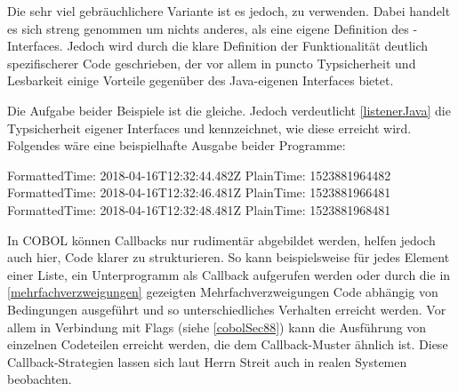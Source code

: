 
Die sehr viel gebräuchlichere Variante ist es jedoch,  zu verwenden. Dabei handelt es sich streng genommen um nichts anderes, als eine eigene Definition des -Interfaces. Jedoch wird durch die klare Definition der Funktionalität deutlich spezifischerer Code geschrieben, der vor allem in puncto Typsicherheit und Lesbarkeit einige Vorteile gegenüber des Java-eigenen Interfaces bietet.


Die Aufgabe beider Beispiele ist die gleiche. Jedoch verdeutlicht \autoref{listenerJava} die Typsicherheit eigener Interfaces und kennzeichnet, wie diese erreicht wird. Folgendes wäre eine beispielhafte Ausgabe beider Programme:

\begin{shellwindow}
FormattedTime: 2018-04-16T12:32:44.482Z
PlainTime: 1523881964482
FormattedTime: 2018-04-16T12:32:46.481Z
PlainTime: 1523881966481
FormattedTime: 2018-04-16T12:32:48.481Z
PlainTime: 1523881968481
\end{shellwindow}

In COBOL können Callbacks nur rudimentär abgebildet werden, helfen jedoch auch hier, Code klarer zu strukturieren. So kann beispielsweise für jedes Element einer Liste, ein Unterprogramm als Callback aufgerufen werden oder durch die in \autoref{mehrfachverzweigungen} gezeigten Mehrfachverzweigungen Code abhängig von Bedingungen ausgeführt und so unterschiedliches Verhalten erreicht werden. Vor allem in Verbindung mit Flags (siehe \autoref{cobolSec88}) kann die Ausführung von einzelnen Codeteilen erreicht werden, die dem Callback-Muster ähnlich ist. Diese Callback-Strategien lassen sich laut Herrn Streit auch in realen Systemen beobachten.
